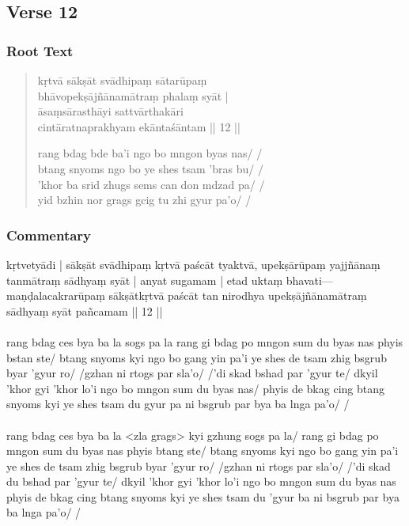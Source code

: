 \documentclass[12pt]{article}
\newcommand{\emdash} {\hspace{0em}—\hspace{0em}}
\begin{document}
\subsection{Verse 12}
\subsubsection{Root Text}
\begin{quote}
	kṛtvā sākṣāt svādhipaṃ sātarūpaṃ \\
	bhāvopekṣājñānamātraṃ\footnoteB{
		bhāvopekṣā°] \EDD\ (\emd); tya((ktvo))pekṣā° (\EDD\ report as jyo, but it cannot be; either ktvo or ktyo)
	} phalaṃ syāt |\\
	āsaṃsārasthāyi sattvārthakāri \\
	cintā\footnoteB{
		cintā°] \MS\PCreading\ \EDD ; cittā° \MS\ACreading
	}ratnaprakhyam\footnoteB{
		°prakhyam] \EDD ; °prakhyaṃm \MS
	} ekāntaśāntam || 12 ||

	rang bdag bde ba'i ngo bo mngon byas nas/ /\\
	btang snyoms ngo bo ye shes tsam 'bras bu/ /\\
	'khor ba srid zhugs sems can don mdzad pa/ /\\
	yid bzhin nor grags gcig tu zhi gyur pa'o/ /
\end{quote}

\subsubsection{Commentary}
kṛtvetyādi | sākṣāt svādhipaṃ kṛtvā paścāt tyaktvā, upekṣārūpaṃ yajjñānaṃ tanmātraṃ sādhyaṃ syāt | anyat sugamam | etad uktaṃ bhavati\emdash maṇḍalacakrarūpaṃ sākṣātkṛtvā paścāt tan nirodhya upekṣājñānamātraṃ sādhyaṃ syāt pañcamam || 12 ||\\

\textbf{\TVA}\\
rang bdag ces bya ba la sogs pa la rang gi bdag po mngon sum du byas nas phyis bstan ste/ btang snyoms kyi ngo bo gang yin pa'i ye shes de tsam zhig bsgrub byar 'gyur ro/ /gzhan ni rtogs par sla'o/ /'di skad bshad par 'gyur te/ dkyil 'khor gyi 'khor lo'i ngo bo mngon sum du byas nas/ phyis de bkag cing btang snyoms kyi ye shes tsam du gyur pa ni bsgrub par bya ba lnga pa'o/ /\\

\textbf{\TVB}\\
rang bdag ces bya ba la <zla grags> kyi gzhung sogs pa la/ rang gi bdag po mngon sum du byas nas phyis btang ste/ btang snyoms kyi ngo bo gang yin pa'i ye shes de tsam zhig bsgrub byar 'gyur ro/ /gzhan ni rtogs par sla'o/ /'di skad du bshad par 'gyur te/ dkyil 'khor gyi 'khor lo'i ngo bo mngon sum du byas nas phyis de bkag cing btang snyoms kyi ye shes tsam du 'gyur ba ni bsgrub par bya ba lnga pa'o/ /
\end{document}
